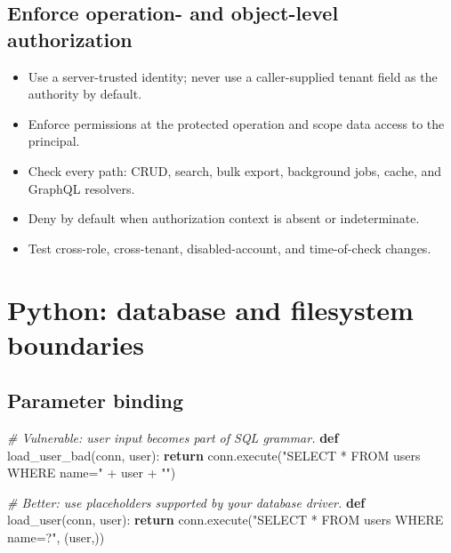 \documentclass[
  letterpaper,
]{article}
\newenvironment{Shaded}{}{}
\newcommand{\CommentTok}[1]{\textcolor[rgb]{0.38,0.63,0.69}{\textit{#1}}}
\newcommand{\ControlFlowTok}[1]{\textcolor[rgb]{0.00,0.44,0.13}{\textbf{#1}}}
\newcommand{\KeywordTok}[1]{\textcolor[rgb]{0.00,0.44,0.13}{\textbf{#1}}}
\newcommand{\NormalTok}[1]{#1}
\newcommand{\OperatorTok}[1]{\textcolor[rgb]{0.40,0.40,0.40}{#1}}
\newcommand{\StringTok}[1]{\textcolor[rgb]{0.25,0.44,0.63}{#1}}
\providecommand{\tightlist}{%
  \setlength{\itemsep}{0pt}\setlength{\parskip}{0pt}}
\begin{document}
\subsection{Enforce operation- and object-level
authorization}\label{enforce-operation--and-object-level-authorization}

\begin{itemize}
\tightlist
\item
  Use a server-trusted identity; never use a caller-supplied tenant
  field as the authority by default.
\item
  Enforce permissions at the protected operation and scope data access
  to the principal.
\item
  Check every path: CRUD, search, bulk export, background jobs, cache,
  and GraphQL resolvers.
\item
  Deny by default when authorization context is absent or indeterminate.
\item
  Test cross-role, cross-tenant, disabled-account, and time-of-check
  changes.
\end{itemize}

\section{Python: database and filesystem
boundaries}\label{python-database-and-filesystem-boundaries}

\subsection{Parameter binding}\label{parameter-binding}

\begin{Shaded}
\begin{Highlighting}[]
\CommentTok{\# Vulnerable: user input becomes part of SQL grammar.}
\KeywordTok{def}\NormalTok{ load\_user\_bad(conn, user):}
    \ControlFlowTok{return}\NormalTok{ conn.execute(}\StringTok{"SELECT * FROM users WHERE name=\textquotesingle{}"} \OperatorTok{+}\NormalTok{ user }\OperatorTok{+} \StringTok{"\textquotesingle{}"}\NormalTok{)}

\CommentTok{\# Better: use placeholders supported by your database driver.}
\KeywordTok{def}\NormalTok{ load\_user(conn, user):}
    \ControlFlowTok{return}\NormalTok{ conn.execute(}\StringTok{"SELECT * FROM users WHERE name=?"}\NormalTok{, (user,))}
\end{Highlighting}
\end{Shaded}
\end{document}
